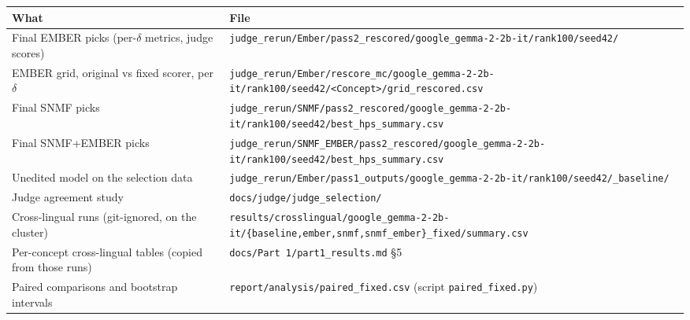 \documentclass[11pt]{article}
\begin{document}
\begin{table}[t]
\centering\footnotesize
\begin{tabular}{@{}p{}p{}@{}}
\toprule
What & File \\
\midrule
Final EMBER picks (per-$\delta$ metrics, judge scores) & \texttt{judge\_\allowbreak{}rerun/\allowbreak{}Ember/\allowbreak{}pass2\_\allowbreak{}rescored/\allowbreak{}google\_\allowbreak{}gemma-2-2b-it/\allowbreak{}rank100/\allowbreak{}seed42/\allowbreak{}} \\
EMBER grid, original vs fixed scorer, per $\delta$ & \texttt{judge\_\allowbreak{}rerun/\allowbreak{}Ember/\allowbreak{}rescore\_\allowbreak{}mc/\allowbreak{}google\_\allowbreak{}gemma-2-2b-it/\allowbreak{}rank100/\allowbreak{}seed42/\allowbreak{}<Concept>/\allowbreak{}grid\_\allowbreak{}rescored.csv} \\
Final SNMF picks & \texttt{judge\_\allowbreak{}rerun/\allowbreak{}SNMF/\allowbreak{}pass2\_\allowbreak{}rescored/\allowbreak{}google\_\allowbreak{}gemma-2-2b-it/\allowbreak{}rank100/\allowbreak{}seed42/\allowbreak{}best\_\allowbreak{}hps\_\allowbreak{}summary.csv} \\
Final SNMF+EMBER picks & \texttt{judge\_\allowbreak{}rerun/\allowbreak{}SNMF\_\allowbreak{}EMBER/\allowbreak{}pass2\_\allowbreak{}rescored/\allowbreak{}google\_\allowbreak{}gemma-2-2b-it/\allowbreak{}rank100/\allowbreak{}seed42/\allowbreak{}best\_\allowbreak{}hps\_\allowbreak{}summary.csv} \\
Unedited model on the selection data & \texttt{judge\_\allowbreak{}rerun/\allowbreak{}Ember/\allowbreak{}pass1\_\allowbreak{}outputs/\allowbreak{}google\_\allowbreak{}gemma-2-2b-it/\allowbreak{}rank100/\allowbreak{}seed42/\allowbreak{}\_\allowbreak{}baseline/\allowbreak{}} \\
Judge agreement study & \texttt{docs/\allowbreak{}judge/\allowbreak{}judge\_\allowbreak{}selection/\allowbreak{}} \\
Cross-lingual runs (git-ignored, on the cluster) & \texttt{results/\allowbreak{}crosslingual/\allowbreak{}google\_\allowbreak{}gemma-2-2b-it/\allowbreak{}\{baseline,ember,snmf,snmf\_\allowbreak{}ember\}\_\allowbreak{}fixed/\allowbreak{}summary.csv} \\
Per-concept cross-lingual tables (copied from those runs) & \texttt{docs/\allowbreak{}Part 1/\allowbreak{}part1\_\allowbreak{}results.md} §5 \\
Paired comparisons and bootstrap intervals & \texttt{report/\allowbreak{}analysis/\allowbreak{}paired\_\allowbreak{}fixed.csv} (script \texttt{paired\_\allowbreak{}fixed.py}) \\

\end{tabular}
\end{table}
\end{document}
